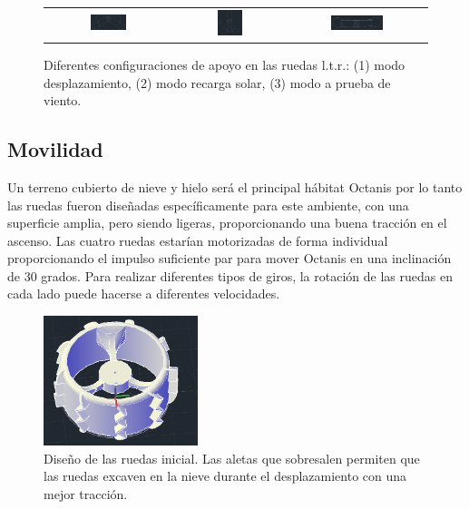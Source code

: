 \documentclass[a4paper,12pt]{article}
\begin{document}
\begin{figure}[h!]
\centering
\begin{tabular}{ c  c  c }
\includegraphics[width=0.3\textwidth]{drive} & \includegraphics[width=0.25\textwidth]{upright} & \includegraphics[width=0.4\textwidth]{flat} \\
\end{tabular}
\caption{Diferentes configuraciones de apoyo en las ruedas l.t.r.: (1) modo desplazamiento, (2) modo recarga solar, (3) modo a prueba de viento.}
\end{figure}


\subsection{Movilidad}
Un terreno cubierto de nieve y hielo será el principal hábitat Octanis por lo tanto las ruedas fueron diseñadas específicamente para este ambiente, con una superficie amplia, pero siendo ligeras, proporcionando una buena tracción en el ascenso. 
Las cuatro ruedas estarían motorizadas de forma individual proporcionando el impulso suficiente par para mover Octanis en una inclinación de 30 grados. Para realizar diferentes tipos de giros, la rotación de las ruedas en cada lado puede hacerse a diferentes velocidades.

\begin{figure}[h!]
	\centering
    \includegraphics[width=0.4\textwidth]{wheel}
    \caption{Diseño de las ruedas inicial. Las aletas que sobresalen permiten que las ruedas excaven en la nieve durante el desplazamiento con una mejor tracción.}
\end{figure}
\end{document}
